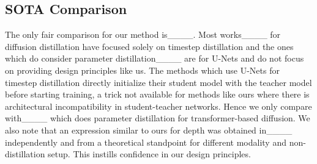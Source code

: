\subsection{SOTA Comparison}
\label{appsubsec: SOTA}
The only fair comparison for our method is____. Most works____ for diffusion distillation have focused solely on timestep distillation and the ones which do consider parameter distillation____ are for U-Nets and do not focus on providing design principles like us. The methods which use U-Nets for timestep distillation directly initialize their student model with the teacher model before starting training, a trick not available for methods like ours where there is architectural incompatibility in student-teacher networks. Hence we only compare with____ which does parameter distillation for transformer-based diffusion. We also note that an expression similar to ours for depth was obtained in____ independently and from a theoretical standpoint for different modality and non-distillation setup. This instills confidence in our design principles.
